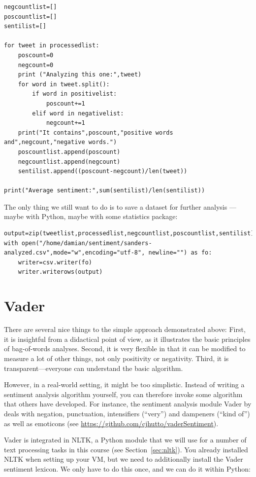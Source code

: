 \documentclass[a4paper,12pt]{book}
\begin{document}
\begin{lstlisting}
negcountlist=[]
poscountlist=[]
sentilist=[]

for tweet in processedlist:
    poscount=0
    negcount=0
    print ("Analyzing this one:",tweet)
    for word in tweet.split():
        if word in positivelist:
            poscount+=1
        elif word in negativelist:
            negcount+=1        
    print("It contains",poscount,"positive words and",negcount,"negative words.")
    poscountlist.append(poscount)
    negcountlist.append(negcount)
    sentilist.append((poscount-negcount)/len(tweet))
    
print("Average sentiment:",sum(sentilist)/len(sentilist))
\end{lstlisting}

The only thing we still want to do is to save a dataset for further analysis --- maybe with Python, maybe with some statistics package:

\begin{lstlisting}
output=zip(tweetlist,processedlist,negcountlist,poscountlist,sentilist)
with open("/home/damian/sentiment/sanders-analyzed.csv",mode="w",encoding="utf-8", newline="") as fo:
    writer=csv.writer(fo)
    writer.writerows(output)
\end{lstlisting}



\section{Vader}
There are several nice things to the simple approach demonstrated above: First, it is insightful from a didactical point of view, as it illustrates the basic principles of bag-of-words analyses. Second, it is very flexible in that it can be modified to measure a lot of other things, not only positivity or negativity. Third, it is transparent---everyone can understand the basic algorithm.

However, in a real-world setting, it might be too simplistic. Instead of writing a sentiment analysis algorithm yourself, you can therefore invoke some algorithm that others have developed. For instance, the sentiment analysis module Vader by \cite{Hutto2014} deals with negation, punctuation, intensifiers (``very'') and dampeners (``kind of'') as well as emoticons (see \url{https://github.com/cjhutto/vaderSentiment}).

Vader is integrated in NLTK, a Python module that we will use for a number of text processing tasks in this course (see Section~\ref{sec:nltk}). You already installed NLTK when setting up your VM, but we need to additionally install the Vader sentiment lexicon. We only have to do this once, and we can do it within Python:
\end{document}
